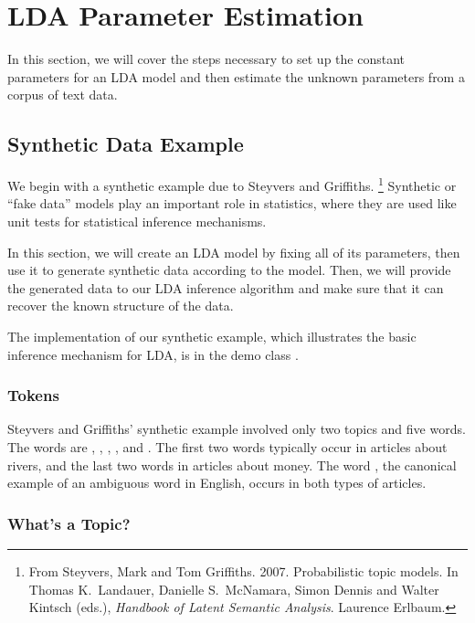 \section{LDA Parameter Estimation}

In this section, we will cover the steps necessary to set up the
constant parameters for an LDA model and then estimate the unknown
parameters from a corpus of text data.

\subsection{Synthetic Data Example}

We begin with a synthetic example due to Steyvers and Griffiths.%
%
\footnote{From Steyvers, Mark and Tom Griffiths. 2007. Probabilistic
  topic models. In Thomas K.~Landauer, Danielle S.~McNamara, Simon
  Dennis and Walter Kintsch (eds.), {\it Handbook of Latent Semantic
    Analysis}. Laurence Erlbaum.}
%
Synthetic or ``fake data'' models play an important role in
statistics, where they are used like unit tests for statistical
inference mechanisms.  

In this section, we will create an LDA model by fixing all of its
parameters, then use it to generate synthetic data according to the
model.  Then, we will provide the generated data to our LDA
inference algorithm and make sure that it can recover the known
structure of the data.

The implementation of our synthetic example, which illustrates
the basic inference mechanism for LDA, is in the demo class
.

\subsubsection{Tokens}

Steyvers and Griffiths' synthetic example involved only two topics and
five words.  The words are ,
, , ,
and .  The first two words typically occur in
articles about rivers, and the last two words in articles about money.
The word , the canonical example of an ambiguous
word in English, occurs in both types of articles.  

\subsubsection{What's a Topic?}


